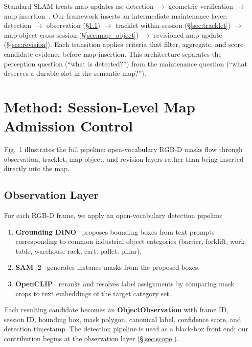 \documentclass[journal]{IEEEtran}
\begin{document}
Standard SLAM treats map updates as: detection $\rightarrow$ geometric verification $\rightarrow$ map insertion~\cite{cadena2016past}. Our framework inserts an intermediate maintenance layer: detection $\rightarrow$ observation (\S\ref{sec:observation}) $\rightarrow$ tracklet within-session (\S\ref{sec:tracklet}) $\rightarrow$ map-object cross-session (\S\ref{sec:map_object}) $\rightarrow$ revisioned map update (\S\ref{sec:revision}). Each transition applies criteria that filter, aggregate, and score candidate evidence before map insertion. This architecture separates the perception question (``what is detected?'') from the maintenance question (``what deserves a durable slot in the semantic map?'').

\section{Method: Session-Level Map Admission Control}
\label{sec:method}

Fig.~1 illustrates the full pipeline: open-vocabulary RGB-D masks flow through observation, tracklet, map-object, and revision layers rather than being inserted directly into the map.

\subsection{Observation Layer}
\label{sec:observation}

For each RGB-D frame, we apply an open-vocabulary detection pipeline:
\begin{enumerate}
  \item \textbf{Grounding DINO}~\cite{liu2024grounding} proposes bounding boxes from text prompts corresponding to common industrial object categories (barrier, forklift, work table, warehouse rack, cart, pallet, pillar).
  \item \textbf{SAM~2}~\cite{ravi2024sam2} generates instance masks from the proposed boxes.
  \item \textbf{OpenCLIP}~\cite{cherti2023reproducible} reranks and resolves label assignments by comparing mask crops to text embeddings of the target category set.
\end{enumerate}
Each resulting candidate becomes an \textbf{ObjectObservation} with frame ID, session ID, bounding box, mask polygon, canonical label, confidence score, and detection timestamp. The detection pipeline is used as a black-box front end; our contribution begins at the observation layer (\S\ref{sec:scope}).
\end{document}

